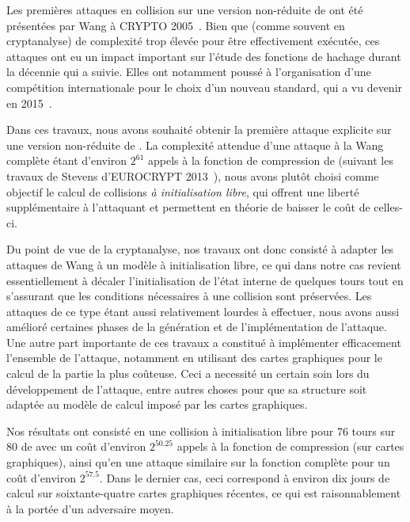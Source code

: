 \medskip

Les premières attaques en collision sur une version non-réduite de \shaone ont été présentées par Wang \etal à CRYPTO 2005~\cite{DBLP:conf/crypto/WangYY05a}. Bien que (comme souvent en cryptanalyse) de complexité
trop élevée pour être effectivement exécutée, ces attaques ont eu un impact important sur l'étude des fonctions de hachage durant la décennie qui a suivie. Elles ont notamment poussé à l'organisation
d'une compétition internationale pour le choix d'un nouveau standard, qui a vu \keccak devenir \shathree en 2015~\cite{Nist-SHA3}.

Dans ces travaux, nous avons souhaité obtenir la première attaque explicite sur une version non-réduite de \shaone. La complexité attendue d'une attaque à la Wang complète étant d'environ $2^{61}$ appels
à la fonction de compression de \shaone (suivant les travaux de Stevens d'EUROCRYPT 2013~\cite{DBLP:conf/eurocrypt/Stevens13}), nous avons plutôt choisi comme objectif le calcul de collisions
\emph{à initialisation libre}, qui offrent une liberté supplémentaire à l'attaquant et permettent en théorie de baisser le coût de celles-ci.

Du point de vue de la cryptanalyse, nos travaux ont
donc consisté à adapter les attaques de Wang \etal à un modèle à initialisation libre, ce qui dans notre cas revient essentiellement à décaler l'initialisation de l'état interne \shaone de quelques
tours tout en s'assurant que les conditions nécessaires à une collision sont préservées. Les attaques de ce type étant aussi relativement lourdes à effectuer, nous avons aussi amélioré certaines
phases de la génération et de l'implémentation de l'attaque.
Une autre part importante de ces travaux a constitué à implémenter efficacement l'ensemble de l'attaque, notamment en utilisant des cartes graphiques pour le calcul de la partie la plus coûteuse.
Ceci a necessité un certain soin lors du développement de l'attaque, entre autres choses pour que sa structure soit adaptée au modèle de calcul imposé par les cartes graphiques.

Nos résultats ont consisté en une collision à initialisation libre pour 76 tours sur 80 de \shaone avec un coût d'environ $2^{50.25}$ appels à la fonction de compression (sur cartes graphiques),
ainsi qu'en une attaque similaire sur la fonction complète pour un coût d'environ $2^{57.5}$. Dans le dernier cas, ceci correspond à environ dix jours de calcul sur soixtante-quatre cartes
graphiques récentes, ce qui est raisonnablement à la portée d'un adversaire moyen.


